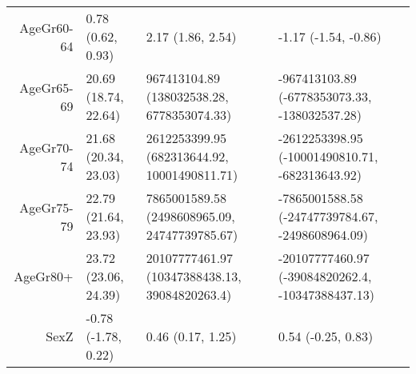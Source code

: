 \begin{table}[ht]
\begin{tabular}{rlll}
  AgeGr60-64 & 0.78 (0.62, 0.93) & 2.17 (1.86, 2.54) & -1.17 (-1.54, -0.86) \\ 
  AgeGr65-69 & 20.69 (18.74, 22.64) & 967413104.89 (138032538.28, 6778353074.33) & -967413103.89 (-6778353073.33, -138032537.28) \\ 
  AgeGr70-74 & 21.68 (20.34, 23.03) & 2612253399.95 (682313644.92, 10001490811.71) & -2612253398.95 (-10001490810.71, -682313643.92) \\ 
  AgeGr75-79 & 22.79 (21.64, 23.93) & 7865001589.58 (2498608965.09, 24747739785.67) & -7865001588.58 (-24747739784.67, -2498608964.09) \\ 
  AgeGr80+ & 23.72 (23.06, 24.39) & 20107777461.97 (10347388438.13, 39084820263.4) & -20107777460.97 (-39084820262.4, -10347388437.13) \\ 
  SexZ & -0.78 (-1.78, 0.22) & 0.46 (0.17, 1.25) & 0.54 (-0.25, 0.83) \\ 
   \hline
\end{tabular}
\end{table}
